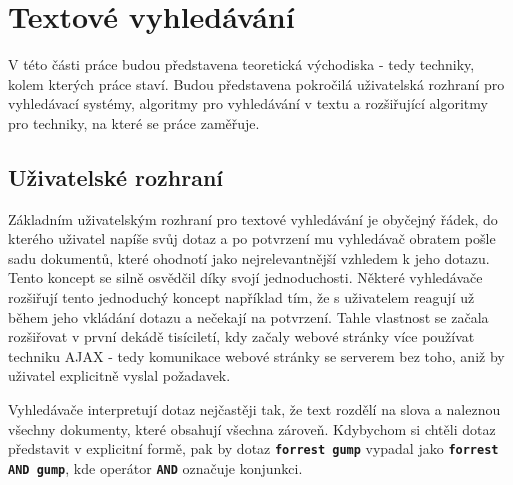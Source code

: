 \documentclass[11pt,letterpaper,oneside,openright]{book}
\newcommand{\bftt}[1]{\texttt{\textbf{#1}}}
\begin{document}


\chapter{Textové vyhledávání}
V této části práce budou představena teoretická východiska - tedy techniky,
kolem kterých práce staví. Budou představena pokročilá uživatelská rozhraní pro
vyhledávací systémy, algoritmy pro vyhledávání v textu a rozšiřující algoritmy
pro techniky, na které se práce zaměřuje.

\section{Uživatelské rozhraní}
Základním uživatelským rozhraní pro textové vyhledávání je obyčejný řádek, do
kterého uživatel napíše svůj dotaz a po potvrzení mu vyhledávač obratem pošle
sadu dokumentů, které ohodnotí jako nejrelevantnější vzhledem k jeho dotazu.
Tento koncept se silně osvědčil díky svojí jednoduchosti. Některé vyhledávače
rozšiřují tento jednoduchý koncept například tím, že s uživatelem reagují už
během jeho vkládání dotazu a nečekají na potvrzení. Tahle vlastnost se začala
rozšiřovat v první dekádě tisíciletí, kdy začaly webové stránky více používat
techniku AJAX - tedy komunikace webové stránky se serverem bez toho, aniž by
uživatel explicitně vyslal požadavek.

Vyhledávače interpretují dotaz nejčastěji tak, že text rozdělí na slova a
naleznou všechny dokumenty, které obsahují všechna zároveň. Kdybychom si chtěli
dotaz představit v explicitní formě, pak by dotaz \bftt{forrest gump} vypadal
jako \bftt{forrest AND gump}, kde operátor \bftt{AND} označuje konjunkci.
\end{document}
